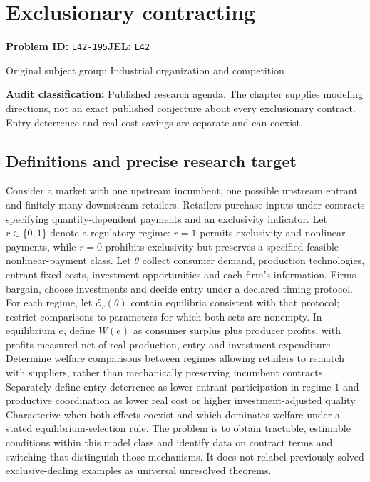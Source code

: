 \documentclass[11pt,a4paper]{article}
\begin{document}
\section*{Exclusionary contracting}
\textbf{Problem ID:} \texttt{L42-195}\quad \textbf{JEL:} \texttt{L42}\par
\label{problem:OP-0399}
{\sffamily\small\color{muted}Original subject group: Industrial organization and competition\par}
\label{definitions:problem:30007681}
\textbf{Audit classification:} Published research agenda. The chapter supplies modeling directions, not an exact published conjecture about every exclusionary contract. Entry deterrence and real-cost savings are separate and can coexist.
\subsection*{Definitions and precise research target}
Consider a market with one upstream incumbent, one possible upstream entrant and finitely many downstream retailers. Retailers purchase inputs under contracts specifying quantity-dependent payments and an exclusivity indicator. Let \(r\in\{0,1\}\) denote a regulatory regime: \(r=1\) permits exclusivity and nonlinear payments, while \(r=0\) prohibits exclusivity but preserves a specified feasible nonlinear-payment class. Let \(\theta\) collect consumer demand, production technologies, entrant fixed costs, investment opportunities and each firm's information. Firms bargain, choose investments and decide entry under a declared timing protocol. For each regime, let \(\mathcal E_r(\theta)\) contain equilibria consistent with that protocol; restrict comparisons to parameters for which both sets are nonempty. In equilibrium \(e\), define \(W(e)\) as consumer surplus plus producer profits, with profits measured net of real production, entry and investment expenditure. Determine welfare comparisons between regimes allowing retailers to rematch with suppliers, rather than mechanically preserving incumbent contracts. Separately define entry deterrence as lower entrant participation in regime \(1\) and productive coordination as lower real cost or higher investment-adjusted quality. Characterize when both effects coexist and which dominates welfare under a stated equilibrium-selection rule. The problem is to obtain tractable, estimable conditions within this model class and identify data on contract terms and switching that distinguish those mechanisms. It does not relabel previously solved exclusive-dealing examples as universal unresolved theorems.
\end{document}
